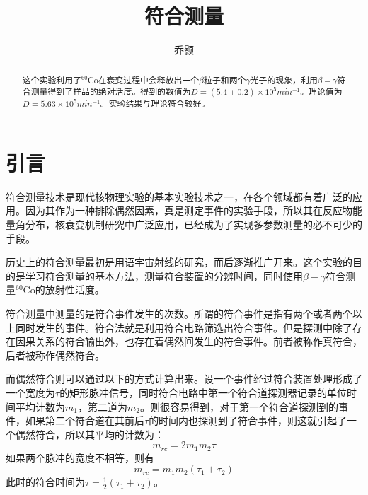 \documentclass[aps,pre,12pt,preprint,onecolumn,showpacs,showkeys,UTF8]{revtex4-1}
\begin{document}
\title{\bf\heiti{}符合测量\vspace{15mm}}
\author{\fangsong 乔颢\vspace{2mm}}
\begin{abstract}
	\vspace{10mm}
	\begin{spacing}{1.5}
		\songti{}
		这个实验利用了$^{60}$Co在衰变过程中会释放出一个$\beta$粒子和两个$\gamma$光子的现象，利用$\beta-\gamma$符合测量得到了样品的绝对活度。得到的数值为$D=(5.4\pm0.2)\times10^5 min^{-1}$。理论值为$D=5.63\times10^5 min^{-1}$。实验结果与理论符合较好。
	\end{spacing}
\end{abstract}

\maketitle

\section{引言}
符合测量技术是现代核物理实验的基本实验技术之一，在各个领域都有着广泛的应用。因为其作为一种排除偶然因素，真是测定事件的实验手段，所以其在反应物能量角分布，核衰变机制研究中广泛应用，已经成为了实现多参数测量的必不可少的手段。

历史上的符合测量最初是用语宇宙射线的研究，而后逐渐推广开来。这个实验的目的是学习符合测量的基本方法，测量符合装置的分辨时间，同时使用$\beta-\gamma$符合测量$^{60}$Co的放射性活度。

符合测量中测量的是符合事件发生的次数。所谓的符合事件是指有两个或者两个以上同时发生的事件。符合法就是利用符合电路筛选出符合事件。但是探测中除了存在因果关系的符合输出外，也存在着偶然间发生的符合事件。前者被称作真符合，后者被称作偶然符合。

而偶然符合则可以通过以下的方式计算出来。设一个事件经过符合装置处理形成了一个宽度为$\tau$的矩形脉冲信号，同时符合电路中第一个符合道探测器记录的单位时间平均计数为$m_1$，第二道为$m_2$。则很容易得到，对于第一个符合道探测到的事件，如果第二个符合道在其前后$\tau$的时间内也探测到了符合事件，则这就引起了一个偶然符合，所以其平均的计数为：
\begin{equation}
	m_{rc}=2m_1m_2\tau
\end{equation}
如果两个脉冲的宽度不相等，则有
\begin{equation}
	m_{rc}=m_1m_2(\tau_1+\tau_2)
\end{equation}
此时的符合时间为$\tau=\frac{1}{2}(\tau_1+\tau_2)$。
\end{document}
